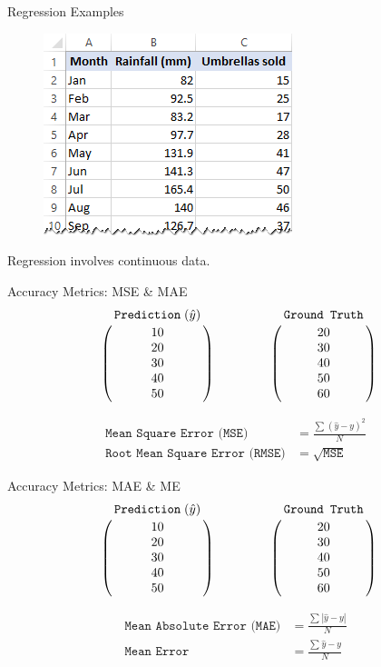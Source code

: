 \documentclass{beamer}
\begin{document}
\begin{frame}{Regression Examples}
\begin{figure}[htp]
    \centering
    \includegraphics[width=0.7\linewidth]{accuracy/reg1.png}
\end{figure}

\pause

Regression involves continuous data.
\end{frame}

\begin{frame}{Accuracy Metrics: MSE \& MAE}
$$
\bordermatrix{&\texttt{Prediction}\;(\hat{y})\cr
               &10\cr
               &20\cr
                &30\cr
                &40\cr
               &50}
\qquad \qquad
\bordermatrix{&\texttt{Ground Truth}\cr
               &20\cr
               &30\cr
                &40\cr
                &50\cr
               &60}
$$

\begin{align*}
\texttt{Mean Square Error (MSE)} &=  \frac{\sum_{}^{}(\hat{y}-y)^2}{N} \\ 
\texttt{Root Mean Square Error (RMSE)} &=  \sqrt{\texttt{MSE}}
\end{align*}

\end{frame}

\begin{frame}{Accuracy Metrics: MAE \& ME}
$$
\bordermatrix{&\texttt{Prediction}\;(\hat{y})\cr
               &10\cr
               &20\cr
                &30\cr
                &40\cr
               &50}
\qquad \qquad
\bordermatrix{&\texttt{Ground Truth}\cr
               &20\cr
               &30\cr
                &40\cr
                &50\cr
               &60}
$$

\begin{align*}
\texttt{Mean Absolute Error (MAE)} &=  \frac{\sum_{}^{}|\hat{y}-y|}{N} \\ 
\texttt{Mean Error} &=  \frac{\sum_{}^{}\hat{y}-y}{N}
\end{align*}

\end{frame}
\end{document}
